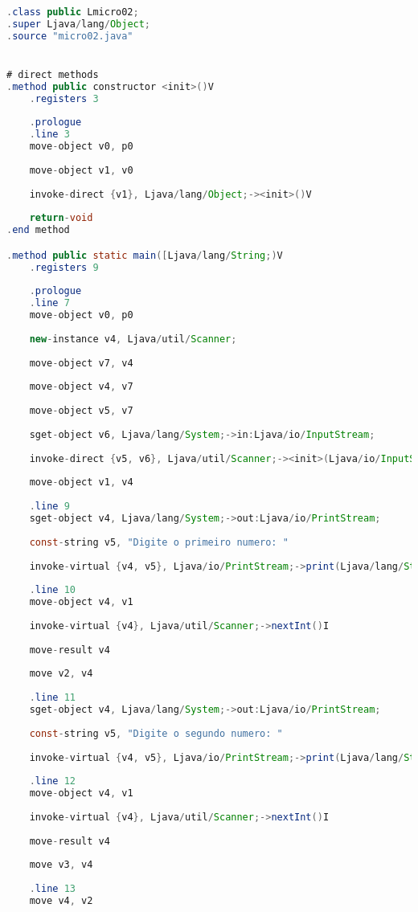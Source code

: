 \documentclass[hidelinks,12pt]{article}
\begin{document}
	\begin{lstlisting}[caption=Smali resultante do .java,language=java]
.class public Lmicro02;
.super Ljava/lang/Object;
.source "micro02.java"


# direct methods
.method public constructor <init>()V
	.registers 3
	
	.prologue
	.line 3
	move-object v0, p0
	
	move-object v1, v0
	
	invoke-direct {v1}, Ljava/lang/Object;-><init>()V
	
	return-void
.end method

.method public static main([Ljava/lang/String;)V
	.registers 9
	
	.prologue
	.line 7
	move-object v0, p0
	
	new-instance v4, Ljava/util/Scanner;
	
	move-object v7, v4
	
	move-object v4, v7
	
	move-object v5, v7
	
	sget-object v6, Ljava/lang/System;->in:Ljava/io/InputStream;
	
	invoke-direct {v5, v6}, Ljava/util/Scanner;-><init>(Ljava/io/InputStream;)V
	
	move-object v1, v4
	
	.line 9
	sget-object v4, Ljava/lang/System;->out:Ljava/io/PrintStream;
	
	const-string v5, "Digite o primeiro numero: "
	
	invoke-virtual {v4, v5}, Ljava/io/PrintStream;->print(Ljava/lang/String;)V
	
	.line 10
	move-object v4, v1
	
	invoke-virtual {v4}, Ljava/util/Scanner;->nextInt()I
	
	move-result v4
	
	move v2, v4
	
	.line 11
	sget-object v4, Ljava/lang/System;->out:Ljava/io/PrintStream;
	
	const-string v5, "Digite o segundo numero: "
	
	invoke-virtual {v4, v5}, Ljava/io/PrintStream;->print(Ljava/lang/String;)V
	
	.line 12
	move-object v4, v1
	
	invoke-virtual {v4}, Ljava/util/Scanner;->nextInt()I
	
	move-result v4
	
	move v3, v4
	
	.line 13
	move v4, v2
	

\end{lstlisting}
\end{document}
